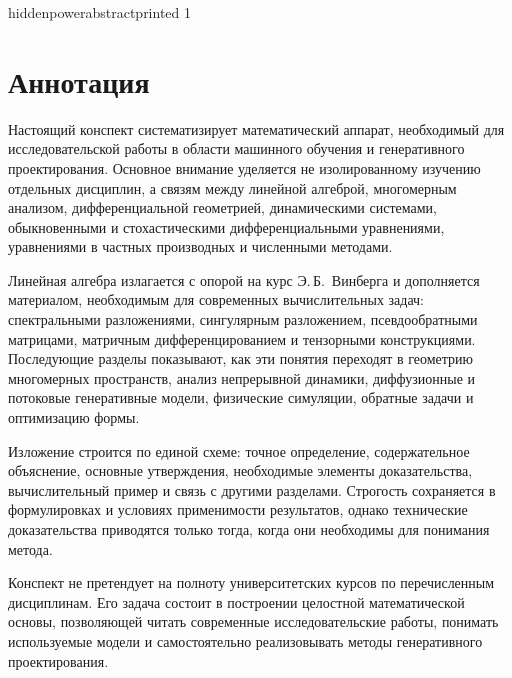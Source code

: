 \ifcsname hiddenpowerabstractprinted\endcsname
\else
  \expandafter\gdef\csname hiddenpowerabstractprinted\endcsname{1}

  \chapter*{Аннотация}

  \begingroup
  \setlength{\emergencystretch}{3em}%
  \begin{sloppypar}
  Настоящий конспект систематизирует математический аппарат, необходимый для исследовательской работы в области машинного обучения и генеративного проектирования. Основное внимание уделяется не изолированному изучению отдельных дисциплин, а связям между линейной алгеброй, многомерным анализом, дифференциальной геометрией, динамическими системами, обыкновенными и стохастическими дифференциальными уравнениями, уравнениями в частных производных и численными методами.

  Линейная алгебра излагается с опорой на курс Э.\,Б.~Винберга и дополняется материалом, необходимым для современных вычислительных задач: спектральными разложениями, сингулярным разложением, псевдообратными матрицами, матричным дифференцированием и тензорными конструкциями. Последующие разделы показывают, как эти понятия переходят в геометрию многомерных пространств, анализ непрерывной динамики, диффузионные и потоковые генеративные модели, физические симуляции, обратные задачи и оптимизацию формы.

  Изложение строится по единой схеме: точное определение, содержательное объяснение, основные утверждения, необходимые элементы доказательства, вычислительный пример и связь с другими разделами. Строгость сохраняется в формулировках и условиях применимости результатов, однако технические доказательства приводятся только тогда, когда они необходимы для понимания метода.

  Конспект не претендует на полноту университетских курсов по перечисленным дисциплинам. Его задача состоит в построении целостной математической основы, позволяющей читать современные исследовательские работы, понимать используемые модели и самостоятельно реализовывать методы генеративного проектирования.
  \end{sloppypar}
  \endgroup
\fi
